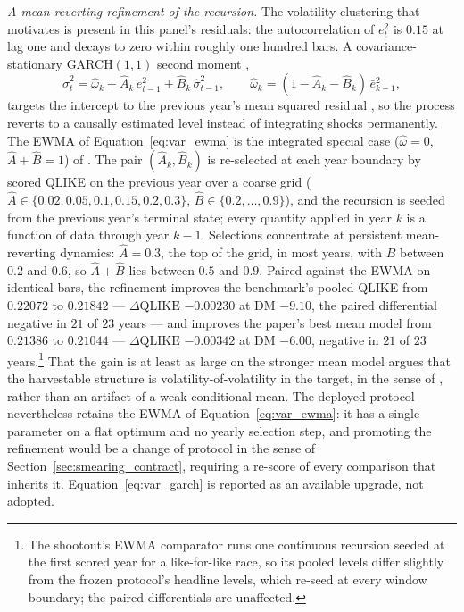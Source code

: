 \emph{A mean-reverting refinement of the recursion.} The volatility
clustering that motivates \citet{CorsiMittnikPigorschPigorsch2008} is
present in this panel's residuals: the autocorrelation of $e_t^2$ is
$0.15$ at lag one and decays to zero within roughly one hundred bars.
A covariance-stationary GARCH$(1,1)$ second moment
\citep{Bollerslev1986},
\begin{equation}
    \hat{\sigma}^2_t
    = \hat\omega_k + \hat{A}_k\, e_{t-1}^2
      + \hat{B}_k\, \hat{\sigma}^2_{t-1},
    \qquad
    \hat\omega_k = (1 - \hat{A}_k - \hat{B}_k)\,\bar{e}^2_{k-1},
    \label{eq:var_garch}
\end{equation}
targets the intercept to the previous year's mean squared residual
\citep{EngleMezrich1996}, so the process reverts to a causally
estimated level instead of integrating shocks permanently. The EWMA of
Equation~\eqref{eq:var_ewma} is the integrated special case
($\hat\omega = 0$, $\hat{A}+\hat{B}=1$) of
\citet{EngleBollerslev1986}. The pair
$(\hat{A}_k, \hat{B}_k)$ is re-selected at each year boundary by
scored QLIKE on the previous year over a coarse grid
($\hat{A} \in \{0.02, 0.05, 0.1, 0.15, 0.2, 0.3\}$,
$\hat{B} \in \{0.2, \dots, 0.9\}$), and the recursion is seeded from
the previous year's terminal state; every quantity applied in year $k$
is a function of data through year $k-1$. Selections concentrate at
persistent mean-reverting dynamics: $\hat{A} = 0.3$, the top of the
grid, in most years, with $\hat{B}$ between $0.2$ and $0.6$, so
$\hat{A} + \hat{B}$ lies between $0.5$ and $0.9$. Paired against the
EWMA on identical bars, the refinement improves the benchmark's pooled
QLIKE from $0.22072$ to $0.21842$ --- $\Delta\mathrm{QLIKE}$
$-0.00230$ at DM $-9.10$, the paired differential negative in $21$ of
$23$ years --- and improves the paper's best mean model from
$0.21386$ to $0.21044$ --- $\Delta\mathrm{QLIKE}$ $-0.00342$ at DM
$-6.00$, negative in $21$ of $23$ years.\footnote{The shootout's EWMA
comparator runs one continuous recursion seeded at the first scored
year for a like-for-like race, so its pooled levels differ slightly
from the frozen protocol's headline levels, which re-seed at every
window boundary; the paired differentials are unaffected.} That the
gain is at least as large on the stronger mean model argues that the
harvestable structure is volatility-of-volatility in the target, in
the sense of \citet{CorsiMittnikPigorschPigorsch2008}, rather than an
artifact of a weak conditional mean. The deployed protocol
nevertheless retains the EWMA of Equation~\eqref{eq:var_ewma}: it has
a single parameter on a flat optimum and no yearly selection step, and
promoting the refinement would be a change of protocol in the sense of
Section~\ref{sec:smearing_contract}, requiring a re-score of every
comparison that inherits it. Equation~\eqref{eq:var_garch} is reported
as an available upgrade, not adopted.

